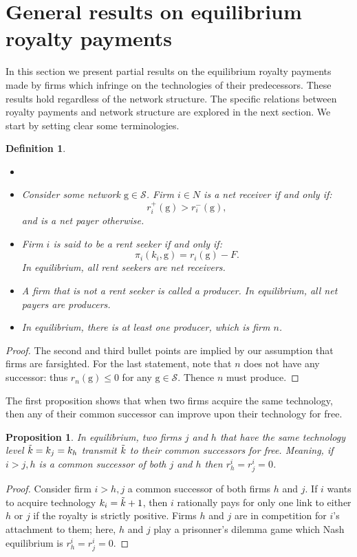\documentclass{article}
\newtheorem{proposition}{Proposition}
\newtheorem{definition}{Definition}
\begin{document}
\section{General results on equilibrium royalty payments}
In this section we present partial results on the equilibrium royalty payments made by firms which infringe on the technologies of their predecessors. These results hold regardless of the network structure. The specific relations between royalty payments and network structure are explored in the next section. We start by setting clear some terminologies. 
\begin{definition}\label{netrandp}
\begin{itemize}
\item[]
    \item Consider some network $\text{g}\in \mathcal{S}$. Firm $i\in N$ is a net receiver if and only if: 
    \begin{equation*}
        r_i^+(\text{g})> r_i^-(\text{g}),
    \end{equation*}
    and is a net payer otherwise. 
    \item Firm $i$ is said to be a rent seeker if and only if:
    \begin{equation*}
        \pi_i(k_i,\text{g})=r_i(\text{g})-F.
    \end{equation*}
    In equilibrium, all rent seekers are net receivers. 
    \item A firm that is not a rent seeker is called a producer. In equilibrium, all net payers are producers.
    \item In equilibrium, there is at least one producer, which is firm $n$. 
\end{itemize}
\end{definition}
\begin{proof}
The second and third bullet points are implied by our assumption that firms are farsighted. For the last statement, note that $n$ does not have any successor: thus $r_n(\text{g})\leq 0$ for any $\text{g}\in \mathcal{S}$. Thence $n$ must produce. 
\end{proof}

The first proposition shows that when two firms acquire the same technology, then any of their common successor can improve upon their technology for free. \\ 

\begin{proposition}\label{prop:zerorevenue}
In equilibrium, two firms $j$ and $h$ that have the same technology level $\Tilde{k}=k_j=k_h$ transmit $\Tilde{k}$ to their common successors for free. Meaning, if $i>j,h$ is a common successor of both $j$ and $h$ then $r^{i}_h=r^{i}_j=0$. 
\end{proposition}
\begin{proof}
Consider firm $i>h,j$ a common successor of both firms $h$ and $j$. If $i$ wants to acquire technology $k_i=\Tilde{k}+1$, then $i$ rationally pays for only one link to either $h$ or $j$ if the royalty is strictly positive. Firms $h$ and $j$ are in competition for $i$'s attachment to them; here, $h$ and $j$ play a prisonner's dilemma game which Nash equilibrium is $r^{i}_h=r^{i}_j=0$.
\end{proof}
\end{document}

